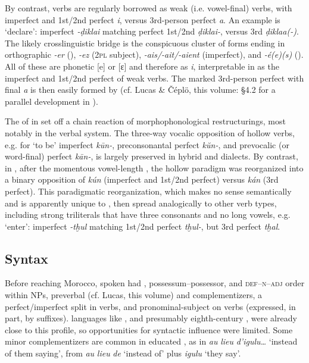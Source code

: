 \documentclass[output=paper]{langsci/langscibook}
\begin{document}
By contrast,  verbs are regularly borrowed as weak (i.e. vowel-final) verbs, with imperfect and 1st/2nd perfect \textit{i}, versus 3rd-person perfect \textit{a}. An example is ‘declare’: imperfect \textit{\nobreakdash-ḍikla{\R}i} matching perfect 1st/2nd \textit{ḍikla{\R}i-}, versus 3rd \textit{ḍikla{\R}a(-)}. The likely crosslinguistic bridge is the conspicuous cluster of  forms ending in orthographic \textit{{}-er} (), \textit{{}-ez} (2\textsc{pl} subject), \textit{{}-ais/-ait/-aient} (imperfect), and \textit{-é(e)(s)} (). All of these are phonetic [e] or [ɛ] and therefore  as  \textit{i}, interpretable in  as the imperfect and 1st/2nd perfect of weak verbs. The marked 3rd-person perfect with final \textit{a} is then easily formed by   (cf. Lucas \& Čéplö, this volume: §4.2 for a parallel development in ).

The  of  in   set off a chain reaction of morphophonological restructurings, most notably in the verbal system. The  three-way vocalic opposition of hollow verbs, e.g. for ‘to be’ imperfect \textit{kūn-}, preconsonantal perfect \textit{kŭn-}, and prevocalic (or word-final) perfect \textit{kān-}, is largely preserved in hybrid and  dialects. By contrast, in  , after the momentous vowel-length , the hollow paradigm was reorganized into a binary opposition of \textit{kún} (imperfect and 1st/2nd perfect) versus \textit{kán} (3rd perfect). This paradigmatic reorganization, which makes no sense semantically and is apparently unique to  , then spread analogically to other verb types, including strong triliterals that have three consonants and no long vowels, e.g. ‘enter’: imperfect \textit{-tḫul} matching 1st/2nd perfect \textit{tḫul-}, but 3rd perfect \textit{tḫal}.

\subsection{Syntax}

Before reaching Morocco, spoken  had , possessum--possessor, and \textsc{def--n--adj} order within NPs, preverbal  (cf. Lucas, this volume) and complementizers, a perfect/imperfect split in verbs, and pronominal-subject  on verbs (expressed, in part, by suffixes).  languages like , and presumably eighth-century , were already close to this profile, so opportunities for syntactic influence were limited. Some minor  complementizers are common in educated , as in \textit{au} \textit{lieu} \textit{d’igulu…} ‘instead of them saying’, from  \textit{au} \textit{lieu} \textit{de} ‘instead of’ plus  \textit{igulu} ‘they say’. 
\end{document}
